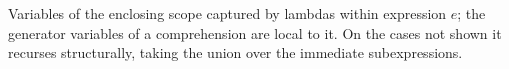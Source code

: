 Variables of the enclosing scope captured by lambdas within expression $e$; the generator variables of a
comprehension are local to it. On the cases not shown it recurses structurally, taking the
union over the immediate subexpressions.
